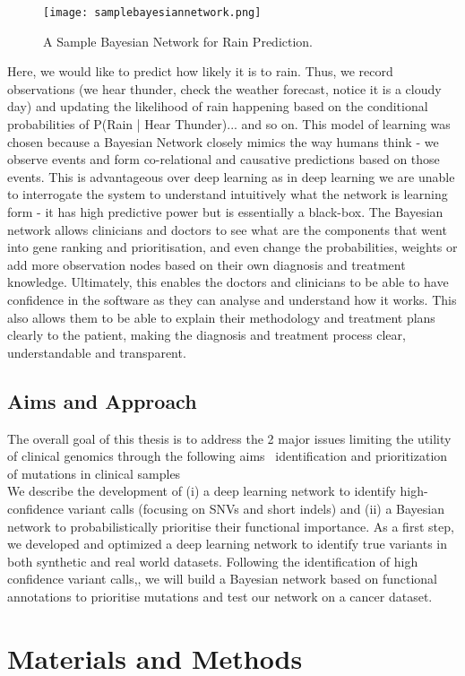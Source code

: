 \documentclass{article}
\begin{document}
\begin{figure}[H]
\texttt{[image: samplebayesiannetwork.png]}
\centering
\caption{A Sample Bayesian Network for Rain Prediction.}
\end{figure}
Here, we would like to predict how likely it is to rain. Thus, we record observations (we hear thunder, check the weather forecast, notice it is a cloudy day) and updating the likelihood of rain happening based on the conditional probabilities of P(Rain | Hear Thunder)... and so on. This model of learning was chosen because a Bayesian Network closely mimics the way humans think - we observe events and form co-relational and causative predictions based on those events. This is advantageous over deep learning as in deep learning we are unable to interrogate the system to understand intuitively what the network is learning form - it has high predictive power but is essentially a black-box. The Bayesian network allows clinicians and doctors to see what are the components that went into gene ranking and prioritisation, and even change the probabilities, weights or add more observation nodes based on their own diagnosis and treatment knowledge. Ultimately, this enables the doctors and clinicians to be able to have confidence in the software as they can analyse and understand how it works. This also allows them to be able to explain their methodology and treatment plans clearly to the patient, making the diagnosis and treatment process clear, understandable and transparent.
\subsection{Aims and Approach}
The overall goal of this thesis is to address the 2 major issues limiting the utility of clinical genomics through the following aims \: \ identification and prioritization of mutations in clinical samples \\ We describe the development of (i) a deep learning network to identify high-confidence variant calls (focusing on SNVs and short indels) and (ii) a Bayesian network to probabilistically prioritise their functional importance. As a first step, we developed and optimized a deep learning network to identify true variants in both synthetic and real world datasets. Following the identification of high confidence variant calls,, we will build a Bayesian network based on functional annotations to prioritise mutations and test our network on a cancer dataset.
\newpage
\section{Materials and Methods}
\end{document}
